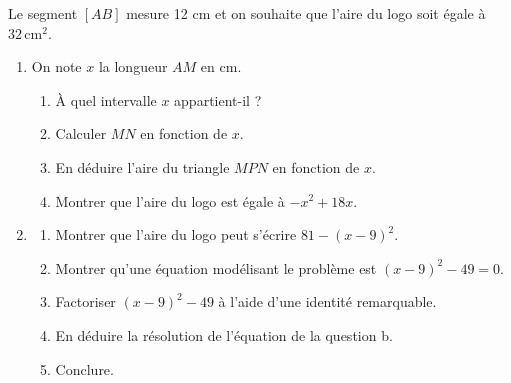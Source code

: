 {\begin{Exercice}
\begin{center}
\end{center}
Le segment $[AB]$ mesure 12 cm et on souhaite que l'aire du logo soit égale à $32 \, \text{cm}^2$.

\begin{enumerate}
    \item On note $x$ la longueur $AM$ en cm.
    \begin{enumerate}
        \item À quel intervalle $x$ appartient-il ?
        \item Calculer $MN$ en fonction de $x$.
        \item En déduire l'aire du triangle $MPN$ en fonction de $x$.
        \item Montrer que l'aire du logo est égale à $-x^2 + 18x$.
    \end{enumerate}
    \item 
    \begin{enumerate}
        \item Montrer que l'aire du logo peut s'écrire $81 - (x - 9)^2$.
        \item Montrer qu'une équation modélisant le problème est $(x - 9)^2 - 49 = 0$.
        \item Factoriser $(x - 9)^2 - 49$ à l'aide d'une identité remarquable.
        \item En déduire la résolution de l'équation de la question b.
        \item Conclure.
    \end{enumerate}
\end{enumerate}
\vspace{-0.3cm}
\end{Exercice}

}
